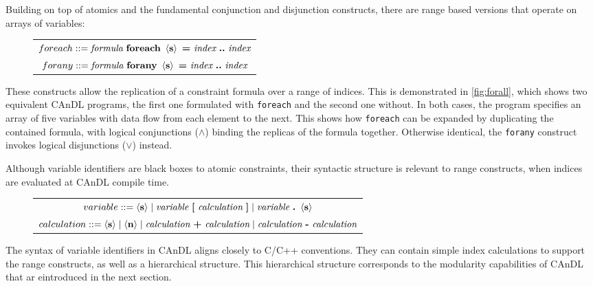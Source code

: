     Building on top of atomics and the fundamental conjunction and disjunction
    constructs, there are range based versions that operate on arrays of
    variables:
\begin{figure}[h]
  \centering
  \begin{tabular}{|c|}
    \hline
    $foreach ::= \text{\it formula}\ \text{\bf foreach}\ \left<\text{\bf s}\right>\ \text{\bf =}\ \text{\it index}\ \text{\bf ..}\ \text{\it index}$\\
    $forany ::= \text{\it formula}\ \text{\bf forany}\ \left<\text{\bf s}\right>\ \text{\bf =}\ \text{\it index}\ \text{\bf ..}\ \text{\it index}$\\
    \hline
  \end{tabular}
\end{figure}

    \noindent
    These constructs allow the replication of a constraint formula over a range
    of indices.
    This is demonstrated in \autoref{fig:forall}, which shows two equivalent
    CAnDL programs, the first one formulated with \texttt{foreach} and the
    second one without.
    In both cases, the program specifies an array of five variables with data
    flow from each element to the next.
    This shows how \texttt{foreach} can be expanded by duplicating the contained
    formula, with logical conjunctions ($\land$) binding the replicas of the
    formula together.
    Otherwise identical, the \texttt{forany} construct invokes logical
    disjunctions ($\lor$) instead.

    Although variable identifiers are black boxes to atomic constraints, their
    syntactic structure is relevant to range constructs, when indices are
    evaluated at CAnDL compile time.

\begin{figure}[h]
  \centering
  \begin{tabular}{|c|}
    \hline
    $variable ::= \left<\text{\bf s}\right>\mid\text{\it variable}\ \text{\bf [}\ \text{\it calculation}\ \text{\bf ]}\mid\text{\it variable}\ \text{\bf.}\ \left<\text{\bf s}\right>$\\
    $calculation ::= \left<\text{\bf s}\right>\mid\left<\text{\bf n}\right>\mid\text{\it calculation}\ \text{\bf+}\ \text{\it calculation}\mid\text{\it calculation}\ \text{\bf-}\ \text{\it calculation}$\\
    \hline
  \end{tabular}
\end{figure}

    \noindent
    The syntax of variable identifiers in CAnDL aligns closely to C/C++
    conventions.
    They can contain simple index calculations to support the range constructs,
    as well as a hierarchical structure.
    This hierarchical structure corresponds to the modularity capabilities of
    CAnDL that ar eintroduced in the next section.

